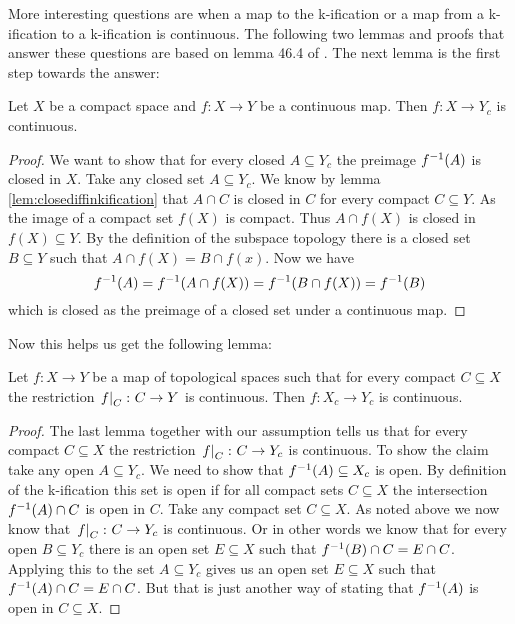 More interesting questions are when a map to the k-ification or a map from a k-ification to a k-ification is continuous. 
The following two lemmas and proofs that answer these questions are based on lemma 46.4 of \cite{Munkres2014}.
The next lemma is the first step towards the answer:

\begin{lem}\label{lem:continuoustokification}
    Let $X$ be a compact space and $f \colon X \to Y$ be a continuous map. 
    Then $f \colon X \to Y_c$ is continuous.
\end{lem}
\begin{proof}
    We want to show that for every closed $A \subseteq Y_c$ the preimage $f^{-1}(A)$ is closed in $X$.
    Take any closed set $A \subseteq Y_c$. 
    We know by lemma \ref{lem:closediffinkification} that $A \cap C$ is closed in $C$ for every compact $C \subseteq Y$.
    As the image of a compact set $f(X)$ is compact. 
    Thus $A \cap f(X)$ is closed in $f(X) \subseteq Y$. 
    By the definition of the subspace topology there is a closed set $B \subseteq Y$ such that $A \cap f(X) = B \cap f(x)$. 
    Now we have 
    \[f^{-1}(A) = f^{-1}(A \cap f(X)) = f^{-1}(B \cap f(X)) = f^{-1}(B)\]
    which is closed as the preimage of a closed set under a continuous map.
\end{proof}

Now this helps us get the following lemma:

\begin{lem}\label{lem:continuousofcontinuousoncompact}
    Let $f \colon X \to Y$ be a map of topological spaces such that for every compact $C \subseteq X$ the restriction $\left.f\right|_{C} \colon C \to Y$ is continuous.
    Then $f \colon X_c \to Y_c$ is continuous.
\end{lem}
\begin{proof}
    The last lemma together with our assumption tells us that for every compact $C \subseteq X$ the restriction $\left.f\right|_{C} \colon C \to Y_c$ is continuous.
    To show the claim take any open $A \subseteq Y_c$.
    We need to show that $f^{-1}(A) \subseteq X_c$ is open. 
    By definition of the k-ification this set is open if for all compact sets $C \subseteq X$ the intersection $f^{-1}(A) \cap C$ is open in $C$. 
    Take any compact set $C \subseteq X$. 
    As noted above we now know that $\left.f\right|_{C} \colon C \to Y_c$ is continuous.
    Or in other words we know that for every open $B \subseteq Y_c$ there is an open set $E \subseteq X$ such that $f^{-1}(B) \cap C = E \cap C$.
    Applying this to the set $A \subseteq Y_c$ gives us an open set $E \subseteq X$ such that $f^{-1}(A) \cap C = E \cap C$.
    But that is just another way of stating that $f^{-1}(A)$ is open in $C \subseteq X$.
\end{proof}

